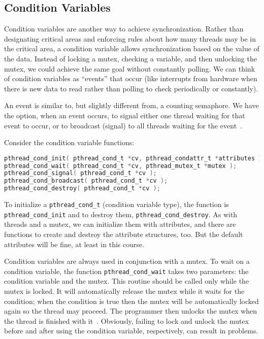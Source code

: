 




\subsection*{Condition Variables}
Condition variables are another way to achieve synchronization. Rather than designating critical areas and enforcing rules about how many threads may be in the critical area, a condition variable allows synchronization based on the value of the data. Instead of locking a mutex, checking a variable, and then unlocking the mutex, we could achieve the same goal without constantly polling. We can think of condition variables as ``events'' that occur (like interrupts from hardware when there is new data to read rather than polling to check periodically or constantly).

An event is similar to, but slightly different from, a counting semaphore. We have the option, when an event occurs, to signal either one thread waiting for that event to occur, or to broadcast (signal) to all threads waiting for the event~\cite{mte241}.

Consider the condition variable functions:

\begin{lstlisting}[language=C]
pthread_cond_init( pthread_cond_t *cv, pthread_condattr_t *attributes );
pthread_cond_wait( pthread_cond_t *cv, pthread_mutex_t *mutex );
pthread_cond_signal( pthread_cond_t *cv );
pthread_cond_broadcast( pthread_cond_t *cv );
pthread_cond_destroy( pthread_cond_t *cv );
\end{lstlisting}

To initialize a \texttt{pthread\_cond\_t} (condition variable type), the function is \texttt{pthread\_cond\_init} and to destroy them, \texttt{pthread\_cond\_destroy}. As with threads and a mutex, we can initialize them with attributes, and there are functions to create and destroy the attribute structures, too. But the default attributes will be fine, at least in this course.

Condition variables are always used in conjunction with a mutex. To wait on a condition variable, the function \texttt{pthread\_cond\_wait} takes two parameters: the condition variable and the mutex. This routine should be called only while the mutex is locked. It will automatically release the mutex while it waits for the condition; when the condition is true then the mutex will be automatically locked again so the thread may proceed. The programmer then unlocks the mutex when the thread is finished with it~\cite{pthreads}. Obviously, failing to lock and unlock the mutex before and after using the condition variable, respectively, can result in problems.

